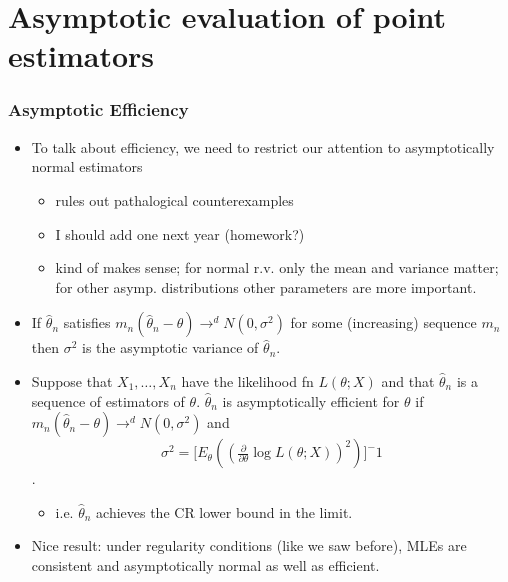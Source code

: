 
\part*{Asymptotic evaluation of point estimators}%

\section{Asymptotic Efficiency}

\begin{itemize}
\item To talk about efficiency, we need to restrict our attention to
      asymptotically normal estimators
\begin{itemize}
\item rules out pathalogical counterexamples
\item I should add one next year (homework?)
\item kind of makes sense; for normal r.v. only the mean and
        variance matter; for other asymp. distributions other
        parameters are more important.
\end{itemize}
\item If $\hat\theta_n$ satisfies $m_n (\hat\theta_n - \theta) \to^d
      N(0, \sigma^2)$ for some (increasing) sequence $m_n$ then
      $\sigma^2$ is the asymptotic variance of $\hat\theta_n$.
\item Suppose that $X_1,\dots,X_n$ have the likelihood fn $L(\theta;
      X)$ and that $\hat\theta_n$ is a sequence of estimators of
      $\theta$.  $\hat\theta_n$ is asymptotically efficient for
      $\theta$ if $m_n (\hat\theta_n - \theta) \to^d N(0, \sigma^2)$
      and 
      \[\sigma^2 = \Big[E_\theta ((\tfrac{\partial}{\partial \theta} \log L(\theta; X))^2)\big]^-1\].
\begin{itemize}
\item i.e. $\hat\theta_n$ achieves the CR lower bound in the limit.
\end{itemize}
\item Nice result: under regularity conditions (like we saw before),
      MLEs are consistent and asymptotically normal as well as
      efficient.
\end{itemize}

